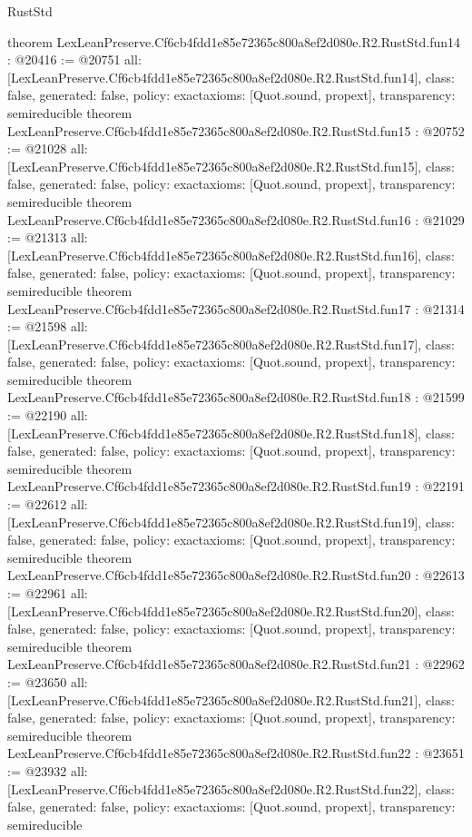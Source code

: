 \begin{lexlean}{RustStd}
\begin{coremodule}
{}
theorem LexLeanPreserve.Cf6cb4fdd1e85e72365c800a8ef2d080e.R2.RustStd.fun14 : @20416 := @20751 {
  all: [LexLeanPreserve.Cf6cb4fdd1e85e72365c800a8ef2d080e.R2.RustStd.fun14],
  class: false,
  generated: false,
  policy: exact{axioms: [Quot.sound, propext]},
  transparency: semireducible
}
theorem LexLeanPreserve.Cf6cb4fdd1e85e72365c800a8ef2d080e.R2.RustStd.fun15 : @20752 := @21028 {
  all: [LexLeanPreserve.Cf6cb4fdd1e85e72365c800a8ef2d080e.R2.RustStd.fun15],
  class: false,
  generated: false,
  policy: exact{axioms: [Quot.sound, propext]},
  transparency: semireducible
}
theorem LexLeanPreserve.Cf6cb4fdd1e85e72365c800a8ef2d080e.R2.RustStd.fun16 : @21029 := @21313 {
  all: [LexLeanPreserve.Cf6cb4fdd1e85e72365c800a8ef2d080e.R2.RustStd.fun16],
  class: false,
  generated: false,
  policy: exact{axioms: [Quot.sound, propext]},
  transparency: semireducible
}
theorem LexLeanPreserve.Cf6cb4fdd1e85e72365c800a8ef2d080e.R2.RustStd.fun17 : @21314 := @21598 {
  all: [LexLeanPreserve.Cf6cb4fdd1e85e72365c800a8ef2d080e.R2.RustStd.fun17],
  class: false,
  generated: false,
  policy: exact{axioms: [Quot.sound, propext]},
  transparency: semireducible
}
theorem LexLeanPreserve.Cf6cb4fdd1e85e72365c800a8ef2d080e.R2.RustStd.fun18 : @21599 := @22190 {
  all: [LexLeanPreserve.Cf6cb4fdd1e85e72365c800a8ef2d080e.R2.RustStd.fun18],
  class: false,
  generated: false,
  policy: exact{axioms: [Quot.sound, propext]},
  transparency: semireducible
}
theorem LexLeanPreserve.Cf6cb4fdd1e85e72365c800a8ef2d080e.R2.RustStd.fun19 : @22191 := @22612 {
  all: [LexLeanPreserve.Cf6cb4fdd1e85e72365c800a8ef2d080e.R2.RustStd.fun19],
  class: false,
  generated: false,
  policy: exact{axioms: [Quot.sound, propext]},
  transparency: semireducible
}
theorem LexLeanPreserve.Cf6cb4fdd1e85e72365c800a8ef2d080e.R2.RustStd.fun20 : @22613 := @22961 {
  all: [LexLeanPreserve.Cf6cb4fdd1e85e72365c800a8ef2d080e.R2.RustStd.fun20],
  class: false,
  generated: false,
  policy: exact{axioms: [Quot.sound, propext]},
  transparency: semireducible
}
theorem LexLeanPreserve.Cf6cb4fdd1e85e72365c800a8ef2d080e.R2.RustStd.fun21 : @22962 := @23650 {
  all: [LexLeanPreserve.Cf6cb4fdd1e85e72365c800a8ef2d080e.R2.RustStd.fun21],
  class: false,
  generated: false,
  policy: exact{axioms: [Quot.sound, propext]},
  transparency: semireducible
}
theorem LexLeanPreserve.Cf6cb4fdd1e85e72365c800a8ef2d080e.R2.RustStd.fun22 : @23651 := @23932 {
  all: [LexLeanPreserve.Cf6cb4fdd1e85e72365c800a8ef2d080e.R2.RustStd.fun22],
  class: false,
  generated: false,
  policy: exact{axioms: [Quot.sound, propext]},
  transparency: semireducible
}
\end{coremodule}
\end{lexlean}

